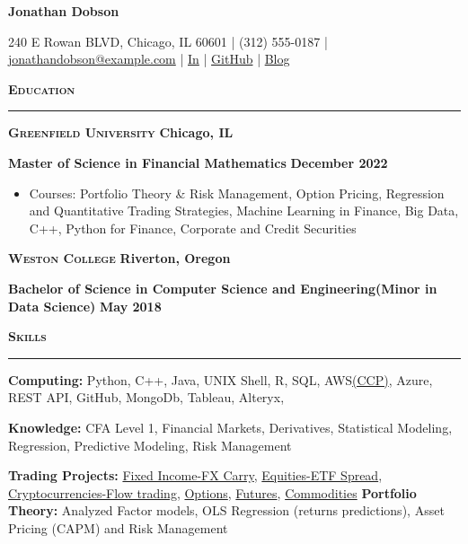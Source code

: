 \documentclass{article}
\newcommand{\vs}{\vspace{0.3cm}}
\begin{document}
\begin{center}
	\textbf{\LARGE Jonathan Dobson}

	240 E Rowan BLVD, Chicago, IL 60601 | (312) 555-0187 | \href{mailto:jonathandobson@example.com}{jonathandobson@example.com} | \href{https://www.example.com/in/jonathan-dobson/}{In} | \href{https://www.example.com/Jonathan27?tab=repositories}{GitHub} | \href{https://jonathansjournal.example.com}{Blog}
\end{center}

\noindent \textbf{\textsc{\large Education}}

\noindent \rule[3pt]{\textwidth}{1pt}

\noindent \textbf{\textsc{Greenfield University}} \hfill \textbf{Chicago, IL}

\noindent \textbf{Master of Science in Financial Mathematics} \hfill \textbf{December 2022}
\begin{itemize}
	\item Courses: Portfolio Theory \& Risk Management, Option Pricing, Regression and Quantitative Trading Strategies, Machine Learning in Finance, Big Data, C++, Python for Finance, Corporate and Credit Securities 
\end{itemize}

\noindent \textbf{\textsc{Weston College}} \hfill \textbf{Riverton, Oregon}

\noindent \textbf{Bachelor of Science in Computer Science and Engineering(Minor in Data Science)} \hfill \textbf{May 2018}
\vs

\noindent \textbf{\textsc{\large Skills}}

\noindent \rule[3pt]{\textwidth}{1pt}

\noindent \textbf{Computing:} Python, C++, Java, UNIX Shell, R, SQL, AWS\href{https://www.example.com/certification/certified-cloud-practitioner/}{(CCP)}, Azure, REST API, GitHub, MongoDb, Tableau, Alteryx, 

\noindent \textbf{Knowledge:} CFA Level 1, Financial Markets, Derivatives, Statistical Modeling, Regression, Predictive Modeling, Risk Management

\noindent \textbf{Trading Projects:} \href{https://www.example.com/Jonathan27/QuantTrading/blob/main/week5/HW5_Jonathan.ipynb}{Fixed Income-FX Carry}, \href{https://www.example.com/Jonathan27/QuantTrading/blob/main/week2/HW-2_jonathan.ipynb}{Equities-ETF Spread}, \href{https://www.example.com/Jonathan27/QuantTrading/blob/main/week4/Jonathan_HW4_submitted.ipynb}{Cryptocurrencies-Flow trading}, \href{}{Options}, \href{}{Futures}, \href{https://www.example.com/Jonathan27/QuantTrading/blob/main/week1/Jonathan_Dobson_HW1.ipynb}{Commodities}
\noindent \textbf{Portfolio Theory:} Analyzed Factor models, OLS Regression (returns predictions), Asset Pricing (CAPM) and Risk Management
\vs
\end{document}
